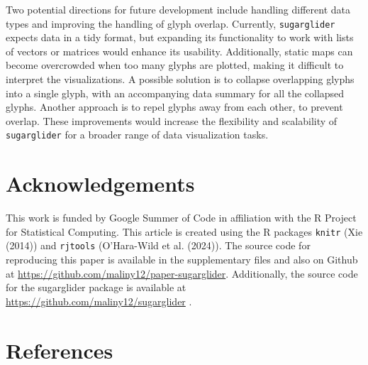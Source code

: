 Two potential directions for future development include handling different data types and improving the handling of glyph overlap. Currently, \texttt{sugarglider} expects data in a tidy format, but expanding its functionality to work with lists of vectors or matrices would enhance its usability. Additionally, static maps can become overcrowded when too many glyphs are plotted, making it difficult to interpret the visualizations. A possible solution is to collapse overlapping glyphs into a single glyph, with an accompanying data summary for all the collapsed glyphs. Another approach is to repel glyphs away from each other, to prevent overlap. These improvements would increase the flexibility and scalability of \texttt{sugarglider} for a broader range of data visualization tasks.

\hypertarget{acknowledgements}{%
\section{Acknowledgements}\label{acknowledgements}}

This work is funded by Google Summer of Code in affiliation with the R Project for Statistical Computing. This article is created using the R packages \texttt{knitr} (Xie (2014)) and \texttt{rjtools} (O'Hara-Wild et al. (2024)). The source code for reproducing this paper is available in the supplementary files and also on Github at \url{https://github.com/maliny12/paper-sugarglider}. Additionally, the source code for the sugarglider package is available at \url{https://github.com/maliny12/sugarglider} .

\hypertarget{references}{%
\section*{References}\label{references}}

